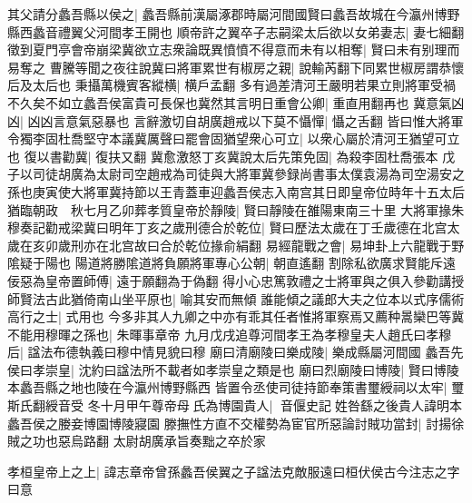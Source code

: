 其父請分蠡吾縣以侯之|{
	蠡吾縣前漢屬涿郡時屬河間國賢曰蠡吾故城在今瀛州博野縣西蠡音禮翼父河間孝王開也}
順帝許之翼卒子志嗣梁太后欲以女弟妻志|{
	妻七細翻}
徵到夏門亭會帝崩梁冀欲立志衆論既異憤憤不得意而未有以相奪|{
	賢曰未有别理而易奪之}
曹騰等聞之夜往說冀曰將軍累世有椒房之親|{
	說輸芮翻下同累世椒房謂恭懷后及太后也}
秉攝萬機賓客縱横|{
	横戶孟翻}
多有過差清河王嚴明若果立則將軍受禍不久矣不如立蠡吾侯富貴可長保也冀然其言明日重會公卿|{
	重直用翻再也}
冀意氣凶凶|{
	凶凶言意氣惡暴也}
言辭激切自胡廣趙戒以下莫不懾憚|{
	懾之舌翻}
皆曰惟大將軍令獨李固杜喬堅守本議冀厲聲曰罷會固猶望衆心可立|{
	以衆心屬於清河王猶望可立也}
復以書勸冀|{
	復扶又翻}
冀愈激怒丁亥冀說太后先策免固|{
	為殺李固杜喬張本}
戊子以司徒胡廣為太尉司空趙戒為司徒與大將軍冀參録尚書事太僕袁湯為司空湯安之孫也庚寅使大將軍冀持節以王青蓋車迎蠡吾侯志入南宫其日即皇帝位時年十五太后猶臨朝政　秋七月乙卯葬孝質皇帝於靜陵|{
	賢曰靜陵在雒陽東南三十里}
大將軍掾朱穆奏記勸戒梁冀曰明年丁亥之歲刑德合於乾位|{
	賢曰歷法太歲在丁壬歲德在北宫太歲在亥卯歲刑亦在北宫故曰合於乾位掾俞絹翻}
易經龍戰之會|{
	易坤卦上六龍戰于野隂疑于陽也}
陽道將勝隂道將負願將軍專心公朝|{
	朝直遙翻}
割除私欲廣求賢能斥遠佞惡為皇帝置師傅|{
	遠于願翻為于偽翻}
得小心忠篤敦禮之士將軍與之俱入參勸講授師賢法古此猶倚南山坐平原也|{
	喻其安而無傾}
誰能傾之議郎大夫之位本以式序儒術高行之士|{
	式用也}
今多非其人九卿之中亦有乖其任者惟將軍察焉又薦种暠欒巴等冀不能用穆暉之孫也|{
	朱暉事章帝}
九月戊戌追尊河間孝王為孝穆皇夫人趙氏曰孝穆后|{
	諡法布德執義曰穆中情見貌曰穆}
廟曰清廟陵曰樂成陵|{
	樂成縣屬河間國}
蠡吾先侯曰孝崇皇|{
	沈約曰諡法所不載者如孝崇皇之類是也}
廟曰烈廟陵曰博陵|{
	賢曰博陵本蠡吾縣之地也陵在今瀛州博野縣西}
皆置令丞使司徒持節奉策書璽綬祠以太牢|{
	璽斯氏翻綬音受}
冬十月甲午尊帝母氏為博園貴人|{
	音偃史記姓咎繇之後貴人諱明本蠡吾侯之媵妾博園博陵寢園}
滕撫性方直不交權勢為宦官所惡論討賊功當封|{
	討揚徐賊之功也惡烏路翻}
太尉胡廣承旨奏黜之卒於家

孝桓皇帝上之上|{
	諱志章帝曾孫蠡吾侯翼之子諡法克敵服遠曰桓伏侯古今注志之字曰意}


